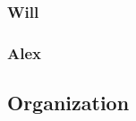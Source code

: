 \documentclass{article}
\begin{document}

\subsubsection{Will}


\subsubsection{Alex}


\subsection{Organization}


\nocite{*}

{}

\end{document}
